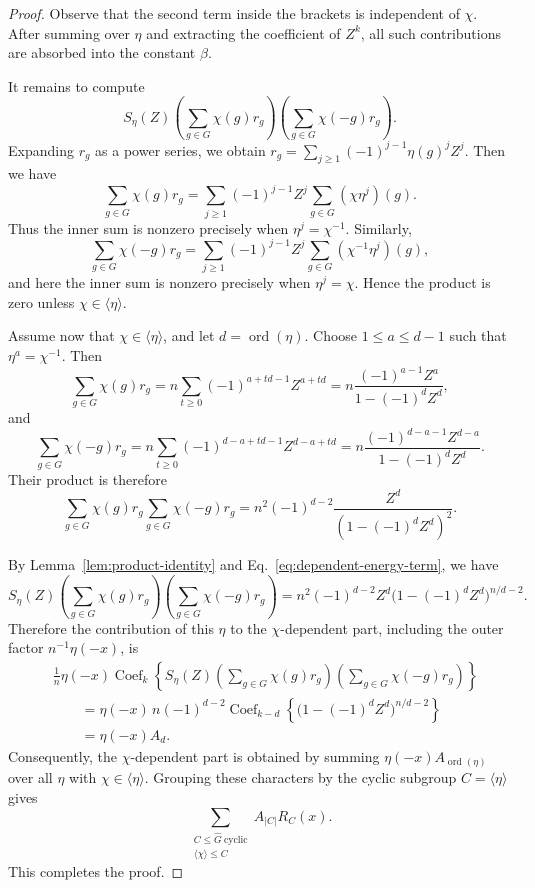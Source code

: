 \documentclass[10pt,a4paper]{amsart}
\DeclareMathOperator{\ord}{ord}
\begin{document}
\begin{proof}
Observe that the second term inside the brackets is independent of \(\chi\). After summing over \(\eta\) and extracting the coefficient of \(Z^k\), all such contributions are absorbed into the constant \(\beta\).

It remains to compute
\[
S_\eta(Z)
\left(\sum_{g\in G}\chi(g)r_g\right)
\left(\sum_{g\in G}\chi(-g)r_g\right).
\]
Expanding \(r_g\) as a power series, we obtain $r_g=\sum_{j\ge1}(-1)^{j-1}\eta(g)^j Z^j$.
Then we have
\[
\sum_{g\in G}\chi(g)r_g
=
\sum_{j\ge1}(-1)^{j-1}Z^j
\sum_{g\in G}(\chi\eta^j)(g).
\]
Thus the inner sum is nonzero precisely when \(\eta^j=\chi^{-1}\).
Similarly,
\[
\sum_{g\in G}\chi(-g)r_g
=
\sum_{j\ge1}(-1)^{j-1}Z^j
\sum_{g\in G}(\chi^{-1}\eta^j)(g),
\]
and here the inner sum is nonzero precisely when \(\eta^j=\chi\).
Hence the product is zero unless \(\chi\in\langle\eta\rangle\).

Assume now that \(\chi\in\langle\eta\rangle\), and let
\(d=\ord(\eta)\). Choose \(1\le a\le d-1\) such that
\(\eta^a=\chi^{-1}\). Then
\[
\sum_{g\in G}\chi(g)r_g
=
n\sum_{t\ge0}(-1)^{a+td-1}Z^{a+td}
=
n\frac{(-1)^{a-1}Z^a}{1-(-1)^d Z^d},
\]
and
\[
\sum_{g\in G}\chi(-g)r_g
=
n\sum_{t\ge0}(-1)^{d-a+td-1}Z^{d-a+td}
=
n\frac{(-1)^{d-a-1}Z^{d-a}}{1-(-1)^d Z^d}.
\]
Their product is therefore
\begin{equation}\label{eq:dependent-energy-term}
\sum_{g\in G}\chi(g)r_g
\sum_{g\in G}\chi(-g)r_g=n^2(-1)^{d-2}\frac{Z^d}{(1-(-1)^d Z^d)^2}.
\end{equation}

By Lemma~\ref{lem:product-identity} and Eq.~\eqref{eq:dependent-energy-term}, we have
\[
S_\eta(Z)
\left(\sum_{g\in G}\chi(g)r_g\right)
\left(\sum_{g\in G}\chi(-g)r_g\right)=n^2(-1)^{d-2}Z^d
\bigl(1-(-1)^d Z^d\bigr)^{n/d-2}.
\]
Therefore the contribution of this \(\eta\) to the \(\chi\)-dependent
part, including the outer factor \(n^{-1}\eta(-x)\), is
\[
\begin{aligned}
	&\frac{1}{n}\eta(-x)\operatorname{Coef}_{k}\left\{S_\eta(Z)
	\left(\sum_{g\in G}\chi(g)r_g\right)
	\left(\sum_{g\in G}\chi(-g)r_g\right)\right\} \\
	&\qquad
	=\eta(-x)\,n(-1)^{d-2}
	\operatorname{Coef}_{k-d}\left\{
	\bigl(1-(-1)^dZ^d\bigr)^{n/d-2}\right\} \\
	&\qquad
	=\eta(-x)A_d.
\end{aligned}
\]
Consequently, the $\chi$-dependent part is obtained by summing $\eta(-x)A_{\ord(\eta)}$ over all $\eta$ with $\chi\in\langle\eta\rangle$. Grouping these characters by the cyclic subgroup $C=\langle\eta\rangle$ gives
\[
\sum_{\substack{C\le\widehat G\ \mathrm{cyclic}\\
		\langle\chi\rangle\le C}}
A_{|C|}R_C(x).
\]
This completes the proof.
\end{proof}
\end{document}

